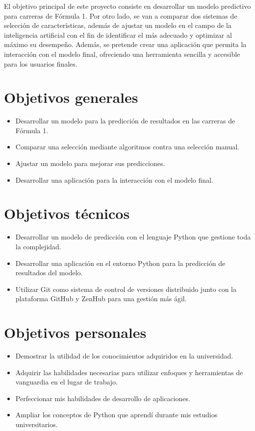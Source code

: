
El objetivo principal de este proyecto consiste en desarrollar un modelo predictivo para carreras de Fórmula 1. Por otro lado, se van a comparar dos sistemas de selección de características, además de ajustar un modelo en el campo de la inteligencia artificial con el fin de identificar el más adecuado y optimizar al máximo su desempeño. Además, se pretende crear una aplicación que permita la interacción con el modelo final, ofreciendo una herramienta sencilla y accesible para los usuarios finales.

\section{Objetivos generales}\label{objetivos-generales}

\begin{itemize}
\tightlist
\item
  Desarrollar un modelo para la predicción de resultados en las carreras de Fórmula 1.
\item
  Comparar una selección mediante algoritmos contra una selección manual.
\item
  Ajustar un modelo para mejorar sus predicciones.
\item
  Desarrollar una aplicación para  la interacción con el modelo final.
\end{itemize}

\section{Objetivos técnicos}\label{objetivos-tecnicos}

\begin{itemize}
\tightlist
\item
  Desarrollar un modelo de predicción con el lenguaje Python que gestione toda la complejidad.
\item
  Desarrollar una aplicación en el entorno Python para la predicción de resultados del modelo.
\item
  Utilizar Git como sistema de control de versiones distribuido junto con la plataforma GitHub y ZenHub para una gestión más ágil.
\end{itemize}

\section{Objetivos personales}\label{objetivos-personales}

\begin{itemize}
\tightlist
\item
  Demostrar la utilidad de los conocimientos adquiridos en la universidad.
\item
  Adquirir las habilidades necesarias para utilizar enfoques y herramientas de vanguardia en el lugar de trabajo.
\item
  Perfeccionar mis habilidades de desarrollo de aplicaciones.
\item
  Ampliar los conceptos de Python que aprendí durante mis estudios universitarios.
\end{itemize}

